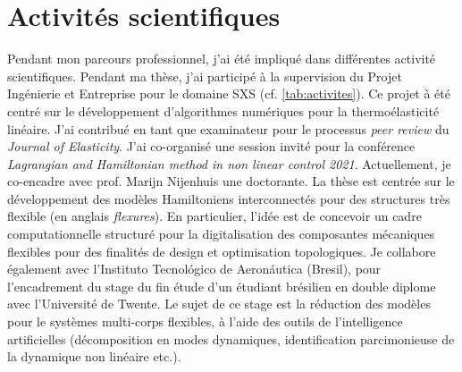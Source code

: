 \documentclass[12pt, french]{article}
\begin{document}
\section{Activités scientifiques}

Pendant mon parcours professionnel, j'ai été impliqué dans différentes activité scientifiques. Pendant ma thèse, j'ai participé à la supervision du Projet Ingénierie et Entreprise pour le domaine SXS (cf. \ref{tab:activites}). Ce projet à été centré sur le développement d'algorithmes numériques pour la thermoélasticité linéaire. J'ai contribué en tant que examinateur pour le processus \textit{peer review} du \textit{Journal of Elasticity}. J'ai co-organisé une session invité pour la conférence \textit{Lagrangian and Hamiltonian method in non linear control 2021}. Actuellement, je co-encadre avec prof. Marijn Nijenhuis une doctorante. La thèse est centrée sur le développement des modèles Hamiltoniens interconnectés pour des structures très flexible (en anglais \textit{flexures}). En particulier, l'idée est de concevoir un cadre computationnelle structuré pour la digitalisation des composantes mécaniques flexibles pour des finalités de design et optimisation topologiques. Je collabore également avec l'Instituto Tecnológico de Aeronáutica (Bresil), pour l'encadrement du stage du fin étude d'un étudiant brésilien en double diplome avec l'Université de Twente. Le sujet de ce stage est la réduction des modèles pour le systèmes multi-corps flexibles, à l'aide des outils de l'intelligence artificielles (décomposition en modes dynamiques, identification parcimonieuse de la dynamique non linéaire etc.).
\end{document}
